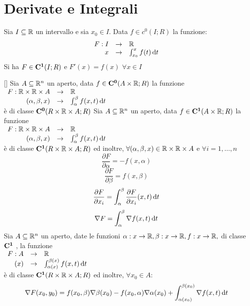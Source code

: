 \newpage
\section{Derivate e Integrali}
\begin{proposition}
	\label{teo:fondament_calcolo_integ}
	Sia $I\subseteq \mathbb{R}$ un intervallo e sia $x_0\in I$. Data $f\in c^0(I;R)$ la funzione:
	\[\begin{array}{rcl} F: I & \to & \mathbb{R} \\ x & \to & \int_{x_0}^{x}f(t)\,\mathrm{d}{t} \end{array}\]
	Si ha $F\in \mathbf{C^{1}}(I;R)$ e $F'(x)=f(x)$ $\forall x \in I$
\end{proposition}[]
\proposition
Sia $A\subseteq \mathbb{R}^n$ un aperto, data $f\in \mathbf{C^{0}}(A\times \mathbb{R};R)$ la funzione \\
$\begin{array}{rcl} F: \mathbb{R}\times \mathbb{R}\times A & \to & \mathbb{R} \\ (\alpha,\beta,x) & \to & \int_{\alpha}^{\beta}f(x,t)\,\mathrm{d}{t} \end{array}$\\
è di classe $\mathbf{C^{0}}(R\times \mathbb{R}\times A;R)$
\proposition
Sia $A\subseteq \mathbb{R}^n$ un aperto, data $f\in \mathbf{C^{1}}(A\times \mathbb{R};R)$ la funzione \\
$\begin{array}{rcl} F: \mathbb{R}\times \mathbb{R}\times A & \to & \mathbb{R} \\ (\alpha,\beta,x) & \to & \int_{\alpha}^{\beta}f(x,t)\,\mathrm{d}{t} \end{array}$\\
è di classe $\mathbf{C^{1}}(R\times \mathbb{R}\times A;R)$ ed inoltre, $\forall (\alpha,\beta,x)\in \mathbb{R}\times \mathbb{R}\times A$ e $\forall i=1,\ldots,n$\\
\[\frac{\partial F}{\partial \alpha}=-f(x,\alpha)\]
\[\frac{\partial F}{\partial \beta}=f(x,\beta)\]
\[\frac{\partial F}{\partial x_i}=\int_{\alpha}^{\beta}\frac{\partial F}{\partial x_i}(x,t)\,\mathrm{d}{t}\]
\[\nabla F=\int_{\alpha}^{\beta}\nabla f(x,t)\,\mathrm{d}{t}\]
\corollary
Sia $A\subseteq \mathbb{R}^n$ un aperto, date le funzioni $\alpha:x\rightarrow \mathbb{R}, \beta:x\rightarrow \mathbb{R}, f:x\rightarrow \mathbb{R}, $ di classe $\mathbf{C^{1}}$ , la funzione \\
$\begin{array}{rcl} F: A & \to & \mathbb{R} \\ (x) & \to & \int_{\alpha(x)}^{\beta(x)}f(x,t)\,\mathrm{d}{t} \end{array}$\\
è di classe $\mathbf{C^{1}}(R\times \mathbb{R}\times A;R)$ ed inoltre, $\forall x_0 \in A$:
\[\nabla F(x_0,y_0)=f(x_0,\beta)\nabla\beta(x_0)-f(x_0,\alpha)\nabla\alpha(x_0)+\int_{\alpha(x_0)}^{\beta(x_0)}\nabla f(x,t)\,\mathrm{d}{t}\]

